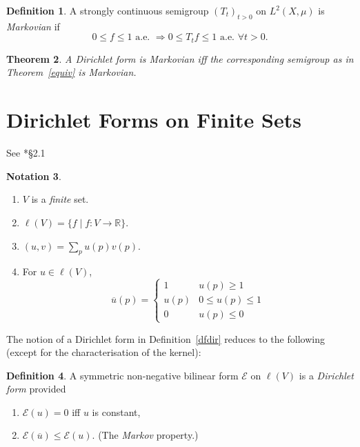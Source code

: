 \documentclass[a4paper]{amsart}
\theoremstyle{plain}
\newtheorem{theorem}{Theorem}[section]
\theoremstyle{definition}
\newtheorem{definition}[theorem]{Definition}%
\newtheorem{notation}[theorem]{Notation}%
\theoremstyle{remark}
\begin{document}
\begin{definition}
 A strongly continuous semigroup $ (T_t)_{t>0} $ on $ L^2(X,\mu) $ is \emph{Markovian} if 
\[
0\leq f \leq 1 \text{ a.e.\ } \Longrightarrow 0\leq T_t f \leq 1 \text{ a.e.\ } \forall t >0 .
\]
\end{definition}

\begin{theorem} A Dirichlet form is Markovian iff the corresponding semigroup as in Theorem~\ref{equiv} is Markovian.
\end{theorem}


\section{\textbf{Dirichlet Forms on Finite Sets}}

See \cite{Kig}*{\S2.1} 

\begin{notation} \mbox{}
\begin{enumerate}
\item  $ V $ is a \emph{finite} set.
\item $ \ell(V) = \{ f \mid f: V \to \mathbb{R} \} $.
\item $ (u,v) = \sum_p u(p) v(p) $.
\item For $ u \in \ell(V) $,
\[
 \overline{u}(p) = 
\begin{cases} 1 & u(p) \geq 1 \\ u(p) & 0 \leq u(p) \leq 1 \\ 0 & u(p) \leq 0 
\end{cases}
\]
\end{enumerate}
\end{notation}

\medskip
The notion of  a Dirichlet form in Definition~\ref{dfdir} reduces to the following (except for the characterisation of the kernel):

\begin{definition} \label{dfdff} A symmetric non-negative bilinear form $ \mathcal{E} $ on $ \ell(V) $ is a \emph{Dirichlet form} provided
\begin{enumerate}
\item $  \mathcal{E} (u) = 0 $ iff $ u $ is constant,
\item $ \mathcal{E} (\overline{u} ) \leq \mathcal{E} (u ) $.  (The \emph{Markov} property.)
\end{enumerate}
\end{definition} 
\end{document}
